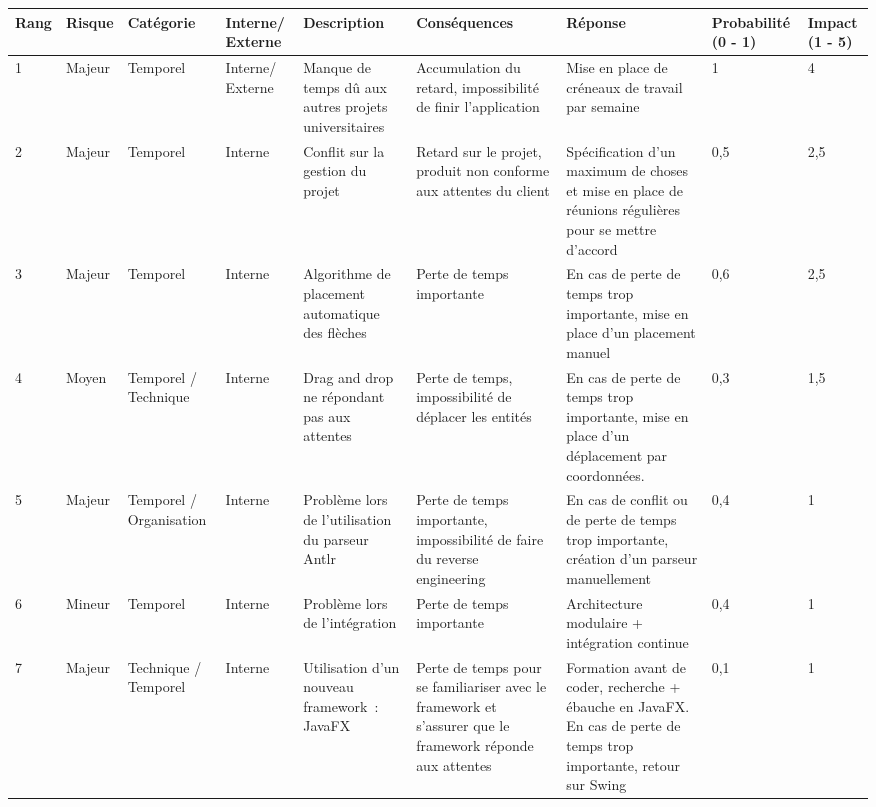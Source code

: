 \documentclass[a4paper,10pt]{article}
\begin{document}
\begin{landscape}
  \begin{tabular}{|p{1cm}|p{1.2cm}|p{2cm}|p{1.6cm}|p{3.5cm}|p{3.5cm}|p{3.5cm}|p{2cm}|p{1.3cm}|}
    \hline{\textbf{Rang}} & {\textbf{Risque}} & {\textbf{Catégorie}} & {\textbf{Interne/ Externe}} & {\textbf{Description}}
    & {\textbf{Conséquences}} &  {\textbf{Réponse}} & {\textbf{Probabilité (0 - 1)}} & {\textbf{Impact (1 - 5)}}\\\hline

    \hline
    {1} & {Majeur} & {Temporel} & {Interne/ Externe} & {Manque de temps dû aux autres projets universitaires} & {Accumulation du retard,
    impossibilité de finir l’application} & {Mise en place de créneaux de travail par semaine} & {1} & {4}\\\hline

    {2} & {Majeur} & {Temporel} & {Interne} & {Conflit sur la gestion du projet} & {Retard sur le projet, produit non conforme aux attentes du client} & {Spécification d’un maximum
    de choses et mise en place de réunions régulières pour se mettre d’accord} & {0,5} & {2,5}\\\hline
    {3} & {Majeur} & {Temporel} & {Interne} & {Algorithme de placement automatique des flèches}  & {Perte de temps importante}
    & {En cas de perte de temps trop importante, mise en place d’un placement manuel} & {0,6} & {2,5}\\\hline
    {4} & {Moyen} & {Temporel / Technique} & {Interne} & {Drag and drop ne répondant pas aux attentes} & {Perte de temps, impossibilité de déplacer les entités} &
    {En cas de perte de temps trop importante, mise en place d’un déplacement par coordonnées.} & {0,3} & {1,5}\\\hline
    {5} & {Majeur} & {Temporel / Organisation} & {Interne} & {Problème lors de l’utilisation du parseur Antlr} & {Perte de temps importante, impossibilité de faire du reverse engineering}
    & {En cas de conflit ou de perte de temps trop importante, création d’un parseur manuellement} & {0,4} & {1}\\\hline
    {6} & {Mineur} & {Temporel} & {Interne} & {Problème lors de l’intégration} & {Perte de temps importante} & {Architecture modulaire + intégration continue}
    & {0,4} & {1}\\\hline
    {7} & {Majeur} & {Technique / Temporel} & {Interne} & {Utilisation d’un nouveau framework~: JavaFX} & {Perte de temps pour se familiariser
    avec le framework et s’assurer que le framework réponde aux attentes} & {Formation avant de coder, recherche + ébauche en JavaFX. En cas de perte de temps trop importante, retour sur Swing
    } & {0,1} & {1}\\\hline


  \end{tabular}
\end{landscape}
\end{document}
